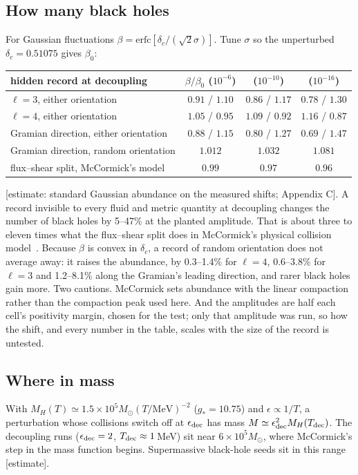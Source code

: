 \documentclass[11pt]{article}
\theoremstyle{definition}\newtheorem{hypothesis}{Hypothesis}\newtheorem{prediction}{Prediction}
\theoremstyle{remark}\newtheorem{remark}[theorem]{Remark}
\newcommand{\grade}[1]{\textsf{\small[#1]}}
\begin{document}
\subsection{How many black holes}
For Gaussian fluctuations $\beta=\mathrm{erfc}[\delta_c/(\sqrt2\sigma)]$. Tune $\sigma$ so the unperturbed $\delta_c=0.51075$ gives $\beta_0$:
\begin{center}\begin{tabular}{lccc}\toprule
hidden record at decoupling & $\beta/\beta_0$ ($10^{-6}$) & ($10^{-10}$) & ($10^{-16}$)\\\midrule
$\ell=3$, either orientation & $0.91$ / $1.10$ & $0.86$ / $1.17$ & $0.78$ / $1.30$\\
$\ell=4$, either orientation & $1.05$ / $0.95$ & $1.09$ / $0.92$ & $1.16$ / $0.87$\\
Gramian direction, either orientation & $0.88$ / $1.15$ & $0.80$ / $1.27$ & $0.69$ / $1.47$\\
Gramian direction, random orientation & $1.012$ & $1.032$ & $1.081$\\\midrule
flux--shear split, McCormick's model & $0.99$ & $0.97$ & $0.96$\\\bottomrule\end{tabular}\end{center}
\grade{estimate: standard Gaussian abundance on the measured shifts; Appendix C}. A record invisible to every fluid and metric quantity at decoupling changes the number of black holes by 5--47\% at the planted amplitude. That is about three to eleven times what the flux--shear split does in McCormick's physical collision model~\cite{NU10}. Because $\beta$ is convex in $\delta_c$, a record of random orientation does not average away: it raises the abundance, by 0.3--1.4\% for $\ell=4$, 0.6--3.8\% for $\ell=3$ and 1.2--8.1\% along the Gramian's leading direction, and rarer black holes gain more. Two cautions. McCormick sets abundance with the linear compaction rather than the compaction peak used here. And the amplitudes are half each cell's positivity margin, chosen for the test; only that amplitude was run, so how the shift, and every number in the table, scales with the size of the record is untested.

\subsection{Where in mass}
With $M_H(T)\simeq1.5\times10^5M_\odot(T/\mathrm{MeV})^{-2}$ ($g_*=10.75$) and $\epsilon\propto1/T$, a perturbation whose collisions switch off at $\epsilon_{\rm dec}$ has mass $M\simeq\epsilon_{\rm dec}^2M_H(T_{\rm dec})$. The decoupling runs ($\epsilon_{\rm dec}=2$, $T_{\rm dec}\approx1$\,MeV) sit near $6\times10^5M_\odot$, where McCormick's step in the mass function begins. Supermassive black-hole seeds sit in this range~\cite{Dave} \grade{estimate}.
\end{document}

